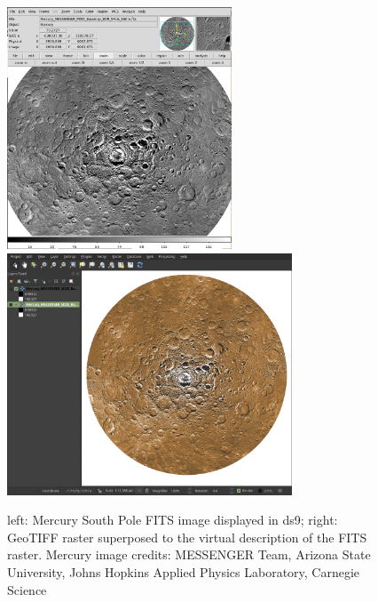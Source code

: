 \begin{figure}[ht!]
\centerline{\includegraphics[height=17pc]{ess_marmo2} \includegraphics[height=17pc]{ess_marmo1}}
\caption{left: Mercury South Pole FITS image displayed in ds9;
right: GeoTIFF raster superposed to the virtual
description of the FITS raster.
Mercury image credits: MESSENGER Team, Arizona State University, Johns Hopkins Applied Physics
Laboratory, Carnegie Science}
\label{fig:ds9qgis}
\end{figure}

